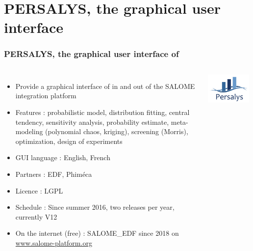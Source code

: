 \documentclass{beamer}
\begin{document}

\section{PERSALYS, the graphical user interface}

\begin{frame}
\frametitle{PERSALYS, the graphical user interface of \ot{}}
	
\begin{columns}
	
\begin{itemize}
\item Provide a graphical interface of 
\ot{} in and out of the SALOME integration platform
\item Features : probabilistic model, 
	distribution fitting, central tendency, 
  sensitivity analysis, probability estimate, 
	meta-modeling (polynomial chaos, kriging), screening (Morris), 
	optimization, design of experiments
\item GUI language : English, French

\item Partners : EDF, Phim\'eca
\item Licence : LGPL

\item Schedule : Since summer 2016, two releases per year, currently V12
\item On the internet (free) : SALOME\_EDF since 2018 on 
\url{www.salome-platform.org}

\end{itemize}


\begin{center}
\includegraphics[width=0.95\textwidth]{figures/PERSALYS-LOGO.png}
\end{center}

\end{columns}


\end{frame}
\end{document}
